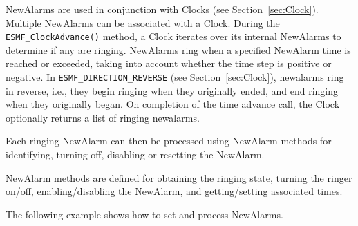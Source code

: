 
NewAlarms are used in conjunction with Clocks (see Section~\ref{sec:Clock}).
Multiple NewAlarms can be associated with a Clock.  During the
{\tt ESMF\_ClockAdvance()} method, a Clock iterates over its internal NewAlarms
to determine if any are ringing.  NewAlarms ring when a specified NewAlarm 
time is reached or exceeded, taking into account whether the time step is
positive or negative.  In {\tt ESMF\_DIRECTION\_REVERSE}
(see Section~\ref{sec:Clock}), newalarms ring in reverse, i.e., they begin
ringing when they originally ended, and end ringing when they originally
began.  On completion of the time advance call, the Clock optionally returns
a list of ringing newalarms.

Each ringing NewAlarm can then be processed using NewAlarm methods for identifying,
turning off, disabling or resetting the NewAlarm.

NewAlarm methods are defined for obtaining the ringing state, turning the
ringer on/off, enabling/disabling the NewAlarm, and getting/setting 
associated times.

The following example shows how to set and process NewAlarms.
